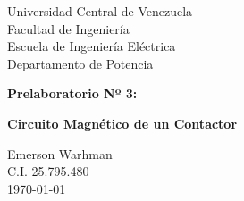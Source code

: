 \begin{titlepage}
    \centering
    \Large
    Universidad Central de Venezuela\\
    Facultad de Ingeniería\\
    Escuela de Ingeniería Eléctrica\\
    Departamento de Potencia
    \vspace*{8cm}

    \Huge
    \textbf{Prelaboratorio Nº 3:}

    \textbf{Circuito Magnético de un Contactor}
    \vfill


    \Large

    Emerson Warhman \\
    C.I. 25.795.480 \\
    \today

\end{titlepage}
